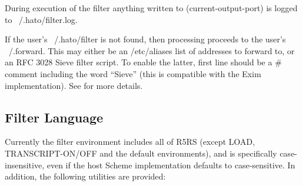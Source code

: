 During execution of the filter anything written to (current-output-port)
is logged to ~/.hato/filter.log.

If the user's ~/.hato/filter is not found, then processing proceeds to
the user's ~/.forward.  This may either be an /etc/aliases list of
addresses to forward to, or an RFC 3028 Sieve filter script.  To
enable the latter, first line should be a # comment including the word
``Sieve'' (this is compatible with the Exim implementation).  See
for more details.

\subsection{Filter Language}

Currently the filter environment includes all of R5RS (except LOAD,
TRANSCRIPT-ON/OFF and the default environments), and is specifically
case-insensitive, even if the host Scheme implementation defaults to
case-sensitive.  In addition, the following utilities are provided:

